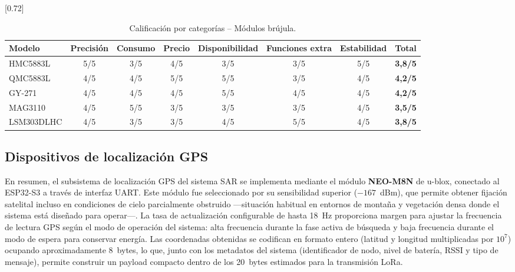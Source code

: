 \begin{table}[H]
\begin{center}
\caption{Calificación por categorías -- Módulos brújula.}
\scalebox{0.72}[0.72]{
\begin{tabular}{| l | c | c | c | c | c | c | c |}
\hline
 \textbf{Modelo} & \textbf{Precisión} & \textbf{Consumo} & \textbf{Precio} & \textbf{Disponibilidad} & \textbf{Funciones extra} & \textbf{Estabilidad} & \textbf{Total} \\
\hline
\hline
 HMC5883L & 5/5 & 3/5 & 4/5 & 3/5 & 3/5 & 5/5 & \textbf{3,8/5} \\
 QMC5883L & 4/5 & 4/5 & 5/5 & 5/5 & 3/5 & 4/5 & \textbf{4,2/5} \\
 GY-271 & 4/5 & 4/5 & 4/5 & 5/5 & 4/5 & 4/5 & \textbf{4,2/5} \\
 MAG3110 & 4/5 & 5/5 & 3/5 & 3/5 & 3/5 & 4/5 & \textbf{3,5/5} \\
 LSM303DLHC & 4/5 & 3/5 & 3/5 & 4/5 & 5/5 & 4/5 & \textbf{3,8/5} \\
\hline
\end{tabular}}
\label{tab:calificacion_brujula}
\end{center}
\end{table}

\subsection{Dispositivos de localización GPS}

En resumen, el subsistema de localización GPS del sistema SAR se implementa mediante el módulo \textbf{NEO-M8N} de u-blox, conectado al ESP32-S3 a través de interfaz UART. Este módulo fue seleccionado por su sensibilidad superior ($-167$~dBm), que permite obtener fijación satelital incluso en condiciones de cielo parcialmente obstruido ---situación habitual en entornos de montaña y vegetación densa donde el sistema está diseñado para operar---. La tasa de actualización configurable de hasta 18~Hz proporciona margen para ajustar la frecuencia de lectura GPS según el modo de operación del sistema: alta frecuencia durante la fase activa de búsqueda y baja frecuencia durante el modo de espera para conservar energía. Las coordenadas obtenidas se codifican en formato entero (latitud y longitud multiplicadas por $10^7$) ocupando aproximadamente 8~bytes, lo que, junto con los metadatos del sistema (identificador de nodo, nivel de batería, RSSI y tipo de mensaje), permite construir un payload compacto dentro de los 20~bytes estimados para la transmisión LoRa.

